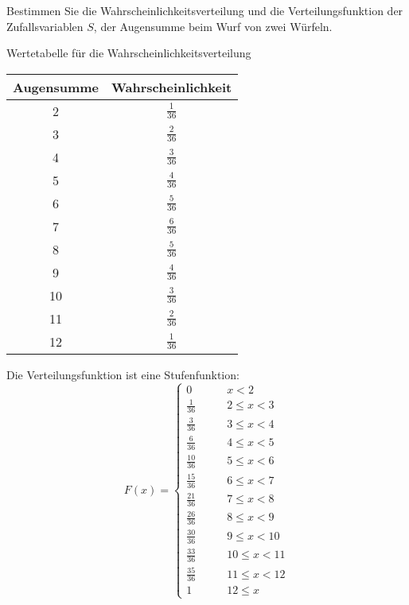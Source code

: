 Bestimmen Sie die Wahrscheinlichkeitsverteilung und die
Verteilungsfunktion der Zufallsvariablen $S$, der Augensumme
beim Wurf von zwei Würfeln.

\begin{loesung}
Wertetabelle für die Wahrscheinlichkeitsverteilung
\begin{center}
\begin{tabular}{|c|c|}
\hline
Augensumme&Wahrscheinlichkeit\\
\hline
2&$\frac{1}{36}$\\
3&$\frac{2}{36}$\\
4&$\frac{3}{36}$\\
5&$\frac{4}{36}$\\
6&$\frac{5}{36}$\\
7&$\frac{6}{36}$\\
8&$\frac{5}{36}$\\
9&$\frac{4}{36}$\\
10&$\frac{3}{36}$\\
11&$\frac{2}{36}$\\
12&$\frac{1}{36}$\\
\hline
\end{tabular}
\end{center}
Die Verteilungsfunktion ist eine Stufenfunktion:
\[
F(x)=
\begin{cases}
0            &\qquad x < 2\\
\frac{1}{36} &\qquad 2 \le x < 3\\
\frac{3}{36} &\qquad 3 \le x < 4\\
\frac{6}{36} &\qquad 4 \le x < 5\\
\frac{10}{36}&\qquad 5 \le x < 6\\
\frac{15}{36}&\qquad 6 \le x < 7\\
\frac{21}{36}&\qquad 7 \le x < 8\\
\frac{26}{36}&\qquad 8 \le x < 9\\
\frac{30}{36}&\qquad 9 \le x < 10\\
\frac{33}{36}&\qquad 10 \le x < 11\\
\frac{35}{36}&\qquad 11 \le x < 12\\
1            &\qquad 12 \le x
\end{cases}
\]
\end{loesung}

